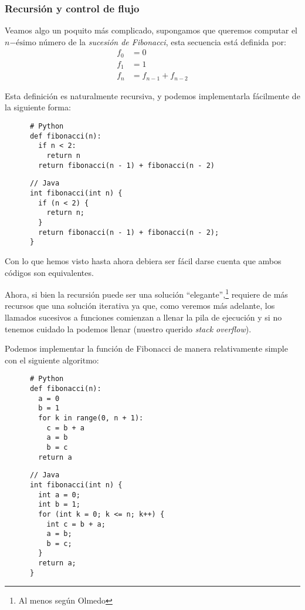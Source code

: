 \subsubsection{Recursión y control de flujo}
    Veamos algo un poquito más complicado, supongamos que queremos computar el \(n\mathrm{-ésimo}\)
    número de la \textit{sucesión de Fibonacci}, esta secuencia está definida por:
    \[
      \begin{aligned}
        f_0 &= 0  \\
        f_1 &= 1  \\
        f_n &= f_{n - 1} + f_{n - 2}
      \end{aligned}
    \]

    Esta definición es naturalmente recursiva, y podemos implementarla fácilmente de la siguiente 
    forma:

    \begin{verbatim}
      # Python
      def fibonacci(n):
        if n < 2:
          return n
        return fibonacci(n - 1) + fibonacci(n - 2)
    \end{verbatim}

    \begin{verbatim}
      // Java
      int fibonacci(int n) {
        if (n < 2) {
          return n;
        }
        return fibonacci(n - 1) + fibonacci(n - 2);
      }
    \end{verbatim}

    Con lo que hemos visto hasta ahora debiera ser fácil darse cuenta que ambos códigos son 
    equivalentes.
    
    Ahora, si bien la recursión puede ser una solución \enquote{elegante},\footnote{Al menos según 
    Olmedo} requiere de más recursos que una solución iterativa ya que, como veremos más adelante,
    los llamados sucesivos a funciones comienzan a llenar la pila de ejecución y si no tenemos 
    cuidado la podemos llenar (nuestro querido \textit{stack overflow}).

    Podemos implementar la función de Fibonacci de manera relativamente simple con el siguiente
    algoritmo:

    \begin{verbatim}
      # Python
      def fibonacci(n):
        a = 0
        b = 1
        for k in range(0, n + 1):
          c = b + a
          a = b
          b = c
        return a
    \end{verbatim}

    \begin{verbatim}
      // Java
      int fibonacci(int n) {
        int a = 0;
        int b = 1;
        for (int k = 0; k <= n; k++) {
          int c = b + a;
          a = b;
          b = c;
        }
        return a;
      }
    \end{verbatim}

